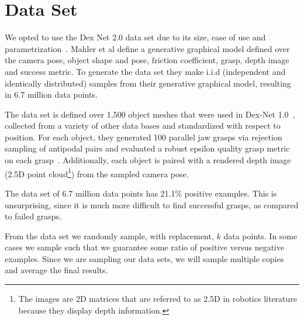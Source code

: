 
\section{Data Set}
\label{sec:data_set}

We opted to use the Dex Net 2.0 data set due to its size, ease of use and parametrization~\cite{mahler2017dex}. 
Mahler et al define a generative graphical model defined over the camera pose, object shape and pose, friction coefficient, grasp, depth image and success metric. 
To generate the data set they make i.i.d (independent and identically distributed) samples from their generative graphical model, resulting in 6.7 million data points. 

The data set is defined over 1,500 object meshes that were used in Dex-Net 1.0~\cite{mahler2016dex}, collected from a variety of other data bases and standardized with respect to position.
For each object, they generated 100 parallel jaw grasps via rejection sampling of antipodal pairs and evaluated a robust epsilon quality grasp metric on each grasp~\cite{seita2016large}. 
Additionally, each object is paired with a rendered depth image (2.5D point cloud\footnote{The images are 2D matrices that are referred to as 2.5D in robotics literature because they display depth information.}) from the sampled camera pose. 

The data set of 6.7 million data points has 21.1\% positive examples. 
This is unsurprising, since it is much more difficult to find successful grasps, as compared to failed grasps. 

From the data set we randomly sample, with replacement, $k$ data points. 
In some cases we sample such that we guarantee some ratio of positive versus negative examples. 
Since we are sampling our data sets, we will sample multiple copies and average the final results. 


